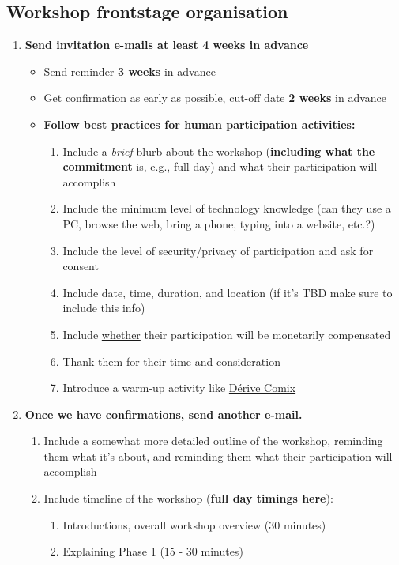 \documentclass[11pt]{article}
\begin{document}
\subsection{Workshop frontstage organisation}
\label{2a01f142-31c7-4e86-ae10-e14e85b4dda9}
\begin{enumerate}
\item \textbf{Send invitation e-mails at least 4 weeks in advance}
\begin{itemize}
\item Send reminder \textbf{3 weeks} in advance
\item Get confirmation as early as possible, cut-off date \textbf{2 weeks} in advance
\item \textbf{Follow best practices for human participation activities:}
\begin{enumerate}
\item Include a \emph{brief} blurb about the workshop (\textbf{including what the commitment} is, e.g., full-day) and what their participation will accomplish
\item Include the minimum level of technology knowledge (can they use a PC, browse the web, bring a phone, typing into a website, etc.?)
\item Include the level of security/privacy of participation and ask for consent
\item Include date, time, duration, and location (if it's TBD make sure to include this info)
\item Include \uline{whether} their participation will be monetarily compensated
\item Thank them for their time and consideration
\item Introduce a warm-up activity like \hyperref[615846a2-1795-40b4-8dfb-3e12923fccc0]{Dérive Comix}
\end{enumerate}
\end{itemize}
\item \textbf{Once we have confirmations, send another e-mail.}
\begin{enumerate}
\item Include a somewhat more detailed outline of the workshop, reminding them what it’s about, and reminding them what their participation will accomplish
\item Include timeline of the workshop (\textbf{full day timings here}):
\begin{enumerate}
\item Introductions, overall workshop overview (30 minutes)
\item Explaining Phase 1 (15 - 30 minutes)

\end{enumerate}
\end{enumerate}
\end{enumerate}
\end{document}
